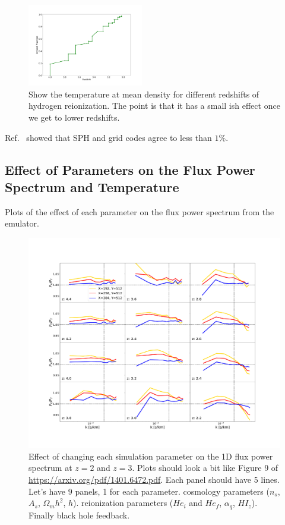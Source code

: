 \documentclass[a4paper,11pt]{article}
\begin{document}
\begin{figure}
\includegraphics[width=0.45\textwidth]{figures/HeIonFrac.pdf}
 \caption{Show the temperature at mean density for different redshifts of hydrogen reionization. The point is that it has a small ish effect once we get to lower redshifts.}
 \label{fig:hydrogentempdens}
\end{figure}

Ref.~\cite{Chabanier:2022} showed that SPH and grid codes agree to less than $1\%$.

\subsection{Effect of Parameters on the Flux Power Spectrum and Temperature}

Plots of the effect of each parameter on the flux power spectrum from the emulator.

\begin{figure}
    \centering
	\includegraphics[width=\columnwidth]{figures/fps_mfr.pdf}
    \caption{Effect of changing each simulation parameter on the 1D flux power spectrum at $z=2$ and $z=3$. Plots should look a bit like Figure 9 of \url{https://arxiv.org/pdf/1401.6472.pdf}. Each panel should have 5 lines. Let's have $9$ panels, 1 for each parameter. cosmology parameters ($n_s$, $A_s$, $\Omega_m h^2$, $h$). reionization parameters ($He_i$ and $He_f$, $\alpha_q$, $HI_z$). Finally black hole feedback. }
    \label{fig:fluxpower}
\end{figure}
\end{document}
